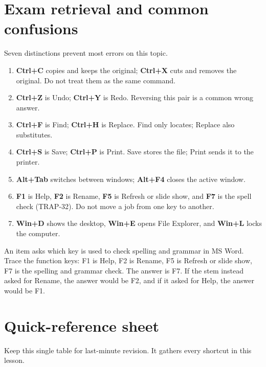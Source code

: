 \section{Exam retrieval and common confusions}
Seven distinctions prevent most errors on this topic.
\begin{enumerate}
  \item \textbf{Ctrl+C} copies and keeps the original; \textbf{Ctrl+X} cuts and
    removes the original. Do not treat them as the same command.
  \item \textbf{Ctrl+Z} is Undo; \textbf{Ctrl+Y} is Redo. Reversing this pair
    is a common wrong answer.
  \item \textbf{Ctrl+F} is Find; \textbf{Ctrl+H} is Replace. Find only locates;
    Replace also substitutes.
  \item \textbf{Ctrl+S} is Save; \textbf{Ctrl+P} is Print. Save stores the
    file; Print sends it to the printer.
  \item \textbf{Alt+Tab} switches between windows; \textbf{Alt+F4} closes the
    active window.
  \item \textbf{F1} is Help, \textbf{F2} is Rename, \textbf{F5} is Refresh or
    slide show, and \textbf{F7} is the spell check (TRAP-32). Do not move a
    job from one key to another.
  \item \textbf{Win+D} shows the desktop, \textbf{Win+E} opens File Explorer,
    and \textbf{Win+L} locks the computer.
\end{enumerate}

\begin{example}
An item asks which key is used to check spelling and grammar in MS Word. Trace
the function keys: F1 is Help, F2 is Rename, F5 is Refresh or slide show, F7 is
the spelling and grammar check. The answer is F7. If the stem instead asked for
Rename, the answer would be F2, and if it asked for Help, the answer would be
F1.
\end{example}

\section{Quick-reference sheet}
Keep this single table for last-minute revision. It gathers every shortcut in
this lesson.

